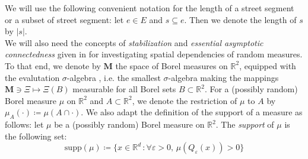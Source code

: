 \documentclass[10pt,a4paper]{amsart}
\theoremstyle{exampstyle}
\theoremstyle{exampnotations}
\begin{document}
\indent We will use the following convenient notation for the length of a street segment or a subset of street segment: let $e \in E$ and $s \subseteq e$. Then we denote the length of $s$ by $\vert s \vert$. \\

We will also need the concepts of \emph{stabilization} and \emph{essential asymptotic connectedness} given in \cite{hirsch2018continuum} for investigating spatial dependencies of random measures. \\
To that end, we denote by $\mathbf{M}$ the space of Borel measures on $\mathbb{R}^{2}$, equipped with the evalutation $\sigma$-algebra \cite[Section 13.1]{last2017lectures}, i.e. the smallest $\sigma$-algebra making the mappings $\mathbf{M} \ni \Xi \mapsto \Xi(B)$ measurable for all Borel sets $B \subset \mathbb{R}^{2}$. For a (possibly random) Borel measure $\mu$ on $\mathbb{R}^{2}$ and $A \subset \mathbb{R}^{2}$, we denote the restriction of $\mu$ to $A$ by $\mu_A(\cdot) \coloneqq \mu(A \cap \cdot)$. We also adapt the definition of the support of a measure as follows: let $\mu$ be a (possibly random) Borel measure on $\mathbb{R}^{2}$. The \emph{support} of $\mu$ is the following set:
$$\text{supp}(\mu) \coloneqq \lbrace x \in \mathbb{R}^{d} \, : \forall \varepsilon > 0, \,  \mu(Q_{\varepsilon}(x)) > 0 \rbrace$$
\end{document}
